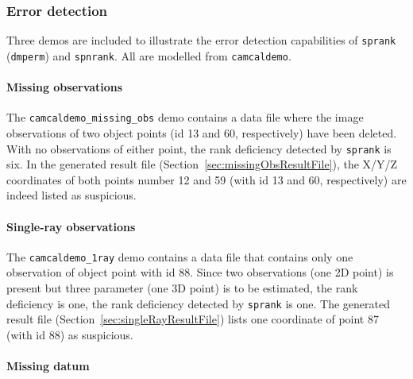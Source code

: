 \documentclass{article}
\begin{document}
\subsubsection{Error detection}
\label{sec:orgbdec06a}

Three demos are included to illustrate the error detection
capabilities of \texttt{sprank} (\texttt{dmperm}) and
\texttt{spnrank}. All are modelled from \texttt{camcaldemo}.

\paragraph{Missing observations}
\label{sec:org43cfba7}

The \texttt{camcaldemo\_missing\_obs} demo contains a data file where the image
observations of two object points (id 13 and 60, respectively) have
been deleted. With no observations of either point, the rank
deficiency detected by \texttt{sprank} is six. In the generated result file
(Section~\ref{sec:missingObsResultFile}), the X/Y/Z coordinates
of both points number 12 and 59 (with id 13 and 60, respectively) are
indeed listed as suspicious.

\paragraph{Single-ray observations}
\label{sec:org43643a7}

The \texttt{camcaldemo\_1ray} demo contains a data file that contains
only one observation of object point with id 88. Since two
observations (one 2D point) is present but three parameter (one 3D
point) is to be estimated, the rank deficiency is one, the rank
deficiency detected by \texttt{sprank} is one. The generated result
file (Section~\ref{sec:singleRayResultFile}) lists one coordinate of
point 87 (with id 88) as suspicious.

\paragraph{Missing datum}
\label{sec:org46e5f40}
\end{document}
